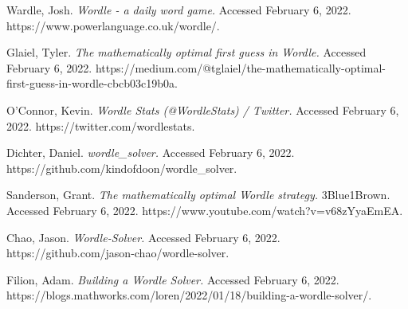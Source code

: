 \documentclass[twocolumn]{tudelft-aiaa}
\begin{document}
\raggedright



\begin{thebibliography}{9}

Wardle, Josh. \emph{Wordle - a daily word game.} Accessed February 6, 2022. https://www.powerlanguage.co.uk/wordle/.

Glaiel, Tyler. \emph{The mathematically optimal first guess in Wordle.} Accessed February 6, 2022. https://medium.com/@tglaiel/the-mathematically-optimal-first-guess-in-wordle-cbcb03c19b0a.

O'Connor, Kevin. \emph{Wordle Stats (@WordleStats) / Twitter.} Accessed February 6, 2022. https://twitter.com/wordlestats.

Dichter, Daniel. \emph{wordle\_solver.} Accessed February 6, 2022. https://github.com/kindofdoon/wordle\_solver.

Sanderson, Grant. \emph{The mathematically optimal Wordle strategy.} 3Blue1Brown. Accessed February 6, 2022. https://www.youtube.com/watch?v=v68zYyaEmEA.

Chao, Jason. \emph{Wordle-Solver.} Accessed February 6, 2022. https://github.com/jason-chao/wordle-solver.

Filion, Adam. \emph{Building a Wordle Solver.} Accessed February 6, 2022. https://blogs.mathworks.com/loren/2022/01/18/building-a-wordle-solver/.

\end{thebibliography}
\end{document}
